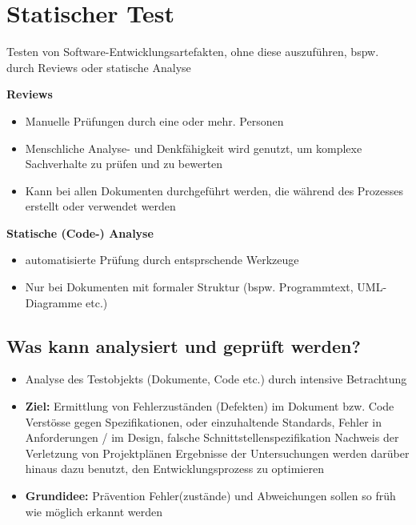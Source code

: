 \documentclass{report}
\theoremstyle{definition}
\theoremstyle{example}
\begin{document}
\chapter{Statischer Test}
Testen von Software-Entwicklungsartefakten, ohne diese auszuführen, bspw. durch Reviews oder statische Analyse

\textbf{Reviews}
\begin{itemize}
   \item Manuelle Prüfungen durch eine oder mehr. Personen
   \item Menschliche Analyse- und Denkfähigkeit wird genutzt, um komplexe Sachverhalte zu prüfen und zu bewerten
   \item Kann bei allen Dokumenten durchgeführt werden, die während des Prozesses erstellt oder verwendet werden
\end{itemize}

\textbf{Statische (Code-) Analyse}
\begin{itemize}
   \item automatisierte Prüfung durch entsprschende Werkzeuge
   \item Nur bei Dokumenten mit formaler Struktur (bspw. Programmtext, UML-Diagramme etc.)
\end{itemize}

\section{Was kann analysiert und geprüft werden?}
\begin{itemize}
   \item Analyse des Testobjekts (Dokumente, Code etc.) durch intensive Betrachtung
   \item \textbf{Ziel:} Ermittlung von Fehlerzuständen (Defekten) im Dokument bzw. Code
   \subitem Verstösse gegen Spezifikationen, oder einzuhaltende Standards, Fehler in Anforderungen / im Design, falsche Schnittstellenspezifikation
   \subitem Nachweis der Verletzung von Projektplänen
   \subitem Ergebnisse der Untersuchungen werden darüber hinaus dazu benutzt, den Entwicklungsprozess zu optimieren
   \item \textbf{Grundidee:} Prävention
   \subitem Fehler(zustände) und Abweichungen sollen so früh wie möglich erkannt werden 
\end{itemize}
\end{document}
